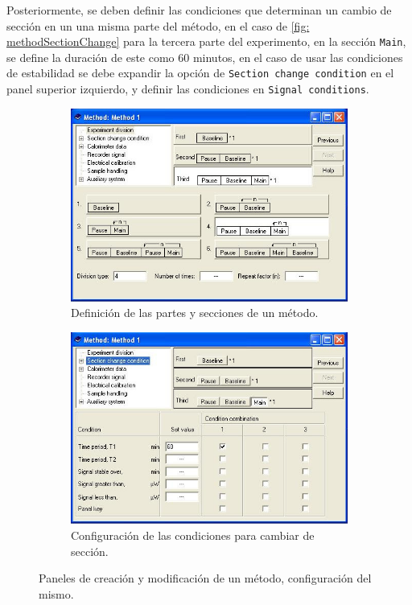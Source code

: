 	Posteriormente, se deben definir las condiciones que determinan un cambio de secci\'on en un una misma parte del m\'etodo, en el caso de \autoref{fig: methodSectionChange} para la tercera parte del experimento, en la secci\'on \texttt{Main}, se define la duraci\'on de este como 60 minutos, en el caso de usar las condiciones de estabilidad se debe expandir la opci\'on de \texttt{Section change condition} en el panel superior izquierdo, y definir las condiciones en \texttt{Signal conditions}.
	\begin{figure}[h]
		\centering
		\begin{subfigure}{0.45\linewidth}
			\includegraphics[width=\linewidth]{Figures/digitamMethod}
			\caption{Definici\'on de las partes y secciones de un m\'etodo.}
			\label{fig: methodCreation}
		\end{subfigure}
		\begin{subfigure}{0.45\linewidth}
			\includegraphics[width=\linewidth]{Figures/digitamMethod2}
			\caption{Configuraci\'on de las condiciones para cambiar de secci\'on.}
			\label{fig: methodSectionChange}
		\end{subfigure}
		\caption{Paneles de creaci\'on y modificaci\'on de un m\'etodo, configuraci\'on del mismo.}
		\label{fig: methodPanel}
	\end{figure}
	
